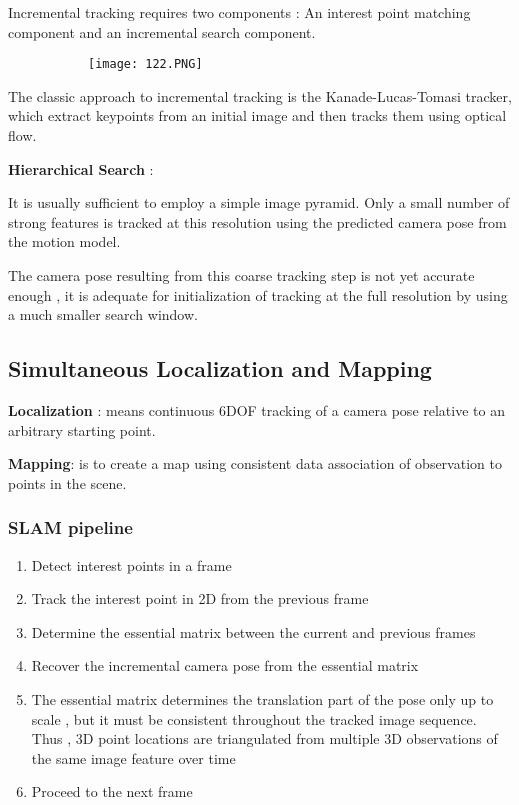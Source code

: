 \documentclass{article}
\begin{document}
Incremental tracking requires two components : An interest point matching component and an incremental search component.

\begin{figure}[ht!]
  \centering
  \begin{subfigure}[b]{0.4\linewidth}
    \texttt{[image: 122.PNG]}
  \end{subfigure}
\end{figure}

The classic approach to incremental tracking is  the Kanade-Lucas-Tomasi tracker, which extract keypoints from an initial image and then tracks them using optical flow.

\textbf{Hierarchical Search} : 

It is usually sufficient to employ a simple image pyramid.
Only a small number of strong features is tracked at this resolution using the predicted camera pose from the motion model.

The camera pose resulting from this coarse tracking step is not yet accurate enough , it is adequate for initialization of tracking at the full resolution by using a much smaller search window.

\subsection{Simultaneous Localization and Mapping}

\textbf{Localization} : means continuous 6DOF tracking of a camera pose relative to an arbitrary starting point.

\textbf{Mapping}: is to create a map using consistent data association of observation to points in the scene.

\subsubsection{SLAM pipeline}

\begin{enumerate}
    \item Detect interest points in a frame
    \item Track the interest point in 2D from the previous frame
    \item Determine the essential matrix between the current and previous frames
    \item Recover the incremental camera pose from the essential matrix
    \item The essential matrix determines the translation part of the pose only up to scale , but it must be consistent throughout the tracked image sequence. Thus , 3D point locations are triangulated from multiple 3D observations of the same image feature over time
    \item Proceed to the next frame
\end{enumerate}
\end{document}
